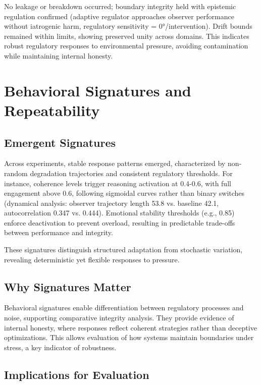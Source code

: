 \documentclass[12pt,a4paper]{report}
\begin{document}
No leakage or breakdown occurred; boundary integrity held with epistemic regulation confirmed (adaptive regulator approaches observer performance without iatrogenic harm, regulatory sensitivity = 0°/intervention). Drift bounds remained within limits, showing preserved unity across domains. This indicates robust regulatory responses to environmental pressure, avoiding contamination while maintaining internal honesty.

\section{Behavioral Signatures and Repeatability}

\subsection{Emergent Signatures}

Across experiments, stable response patterns emerged, characterized by non-random degradation trajectories and consistent regulatory thresholds. For instance, coherence levels trigger reasoning activation at 0.4-0.6, with full engagement above 0.6, following sigmoidal curves rather than binary switches (dynamical analysis: observer trajectory length 53.8 vs. baseline 42.1, autocorrelation 0.347 vs. 0.444). Emotional stability thresholds (e.g., 0.85) enforce deactivation to prevent overload, resulting in predictable trade-offs between performance and integrity.

These signatures distinguish structured adaptation from stochastic variation, revealing deterministic yet flexible responses to pressure.

\subsection{Why Signatures Matter}

Behavioral signatures enable differentiation between regulatory processes and noise, supporting comparative integrity analysis. They provide evidence of internal honesty, where responses reflect coherent strategies rather than deceptive optimizations. This allows evaluation of how systems maintain boundaries under stress, a key indicator of robustness.

\subsection{Implications for Evaluation}
\end{document}
